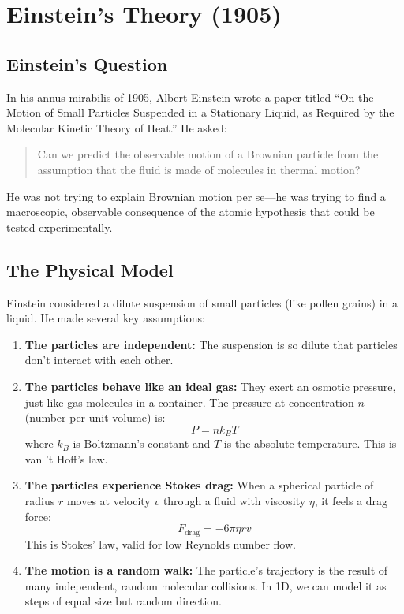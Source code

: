 \documentclass[11pt,a4paper]{article}
\begin{document}
	\section{Einstein's Theory (1905)}
	
	\subsection{Einstein's Question}
	
	In his annus mirabilis of 1905, Albert Einstein wrote a paper titled ``On the Motion of Small Particles Suspended in a Stationary Liquid, as Required by the Molecular Kinetic Theory of Heat.'' He asked:
	
	\begin{quote}
		Can we predict the observable motion of a Brownian particle from the assumption that the fluid is made of molecules in thermal motion?
	\end{quote}
	
	He was not trying to explain Brownian motion per se---he was trying to find a macroscopic, observable consequence of the atomic hypothesis that could be tested experimentally.
	
	\subsection{The Physical Model}
	
	Einstein considered a dilute suspension of small particles (like pollen grains) in a liquid. He made several key assumptions:
	
	\begin{enumerate}[label=\arabic*.]
		\item \textbf{The particles are independent:} The suspension is so dilute that particles don't interact with each other.
		\item \textbf{The particles behave like an ideal gas:} They exert an osmotic pressure, just like gas molecules in a container. The pressure at concentration $n$ (number per unit volume) is:
		\begin{equation}
			P = n k_B T
		\end{equation}
		where $k_B$ is Boltzmann's constant and $T$ is the absolute temperature. This is van 't Hoff's law.
		\item \textbf{The particles experience Stokes drag:} When a spherical particle of radius $r$ moves at velocity $v$ through a fluid with viscosity $\eta$, it feels a drag force:
		\begin{equation}
			F_{\text{drag}} = -6\pi \eta r v
		\end{equation}
		This is Stokes' law, valid for low Reynolds number flow.
		\item \textbf{The motion is a random walk:} The particle's trajectory is the result of many independent, random molecular collisions. In 1D, we can model it as steps of equal size but random direction.
	\end{enumerate}
	
\end{document}

